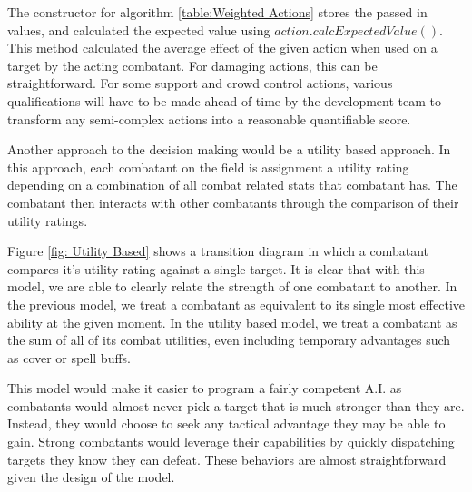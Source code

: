 \documentclass[12pt,a4paper]{report}
\begin{document}
		
		The constructor for algorithm \ref{table:Weighted Actions} stores the passed in values, and calculated the expected value using $action.calcExpectedValue()$. This method calculated the average effect of the given action when used on a target by the acting combatant. For damaging actions, this can be straightforward. For some support and crowd control actions, various qualifications will have to be made ahead of time by the development team to transform any semi-complex actions into a reasonable quantifiable score.
		
		
		Another approach to the decision making would be a utility based approach. In this approach, each combatant on the field is assignment a utility rating depending on a combination of all combat related stats that combatant has. The combatant then interacts with other combatants through the comparison of their utility ratings. 
		
		Figure \ref{fig: Utility Based} shows a transition diagram in which a combatant compares it's utility rating against a single target. It is clear that with this model, we are able to clearly relate the strength of one combatant to another. In the previous model, we treat a combatant as equivalent to its single most effective ability at the given moment. In the utility based model, we treat a combatant as the sum of all of its combat utilities, even including temporary advantages such as cover or spell buffs. 
		
		This model would make it easier to program a fairly competent A.I. as combatants would almost never pick a target that is much stronger than they are. Instead, they would choose to seek any tactical advantage they may be able to gain. Strong combatants would leverage their capabilities by quickly dispatching targets they know they can defeat. These behaviors are almost straightforward given the design of the model.
		
		
\end{document}

